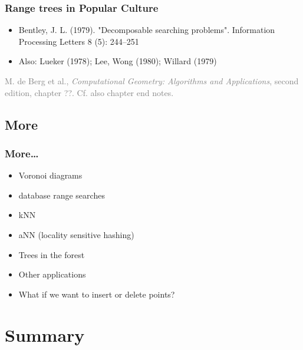 \documentclass{beamer}
\begin{document}
\begin{frame}
  \frametitle{Range trees in Popular Culture}
  \begin{itemize}
  \item Bentley, J. L. (1979). "Decomposable searching
    problems". Information Processing Letters 8 (5): 244–251
  \item Also: Lueker (1978); Lee, Wong (1980); Willard (1979)
  \end{itemize}

  \bigskip \textcolor{gray}{ 
    M. de Berg et al., \textit{Computational Geometry: Algorithms and
      Applications}, second edition, chapter ??.  Cf. also chapter end
    notes.}


\end{frame}

\subsection{More}

\begin{frame}
  \frametitle{More\dots}
  \begin{itemize}
  \item Voronoi diagrams
  \item database range searches
  \item kNN
  \item aNN (locality sensitive hashing)
  \item Trees in the forest
  \item Other applications
  \item What if we want to insert or delete points?
  \end{itemize}
\end{frame}


\section*{Summary}
\end{document}
